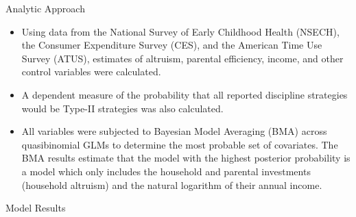 \documentclass[handout]{beamer}
\begin{document}
\begin{frame}{Analytic Approach}

\begin{itemize}[<+->]
\itemsep1pt\parskip0pt
\item
  Using data from the National Survey of Early Childhood Health (NSECH),
  the Consumer Expenditure Survey (CES), and the American Time Use
  Survey (ATUS), estimates of altruism, parental efficiency, income, and
  other control variables were calculated.
\end{itemize}

\begin{itemize}[<+->]
\itemsep1pt\parskip0pt
\item
  A dependent measure of the probability that all reported discipline
  strategies would be Type-II strategies was also calculated.
\end{itemize}

\begin{itemize}[<+->]
\itemsep1pt\parskip0pt
\item
  All variables were subjected to Bayesian Model Averaging (BMA) across
  quasibinomial GLMs to determine the most probable set of covariates.
  The BMA results estimate that the model with the highest posterior
  probability is a model which only includes the household and parental
  investments (household altruism) and the natural logarithm of their
  annual income.
\end{itemize}

\end{frame}

\begin{frame}{Model Results}


\end{frame}
\end{document}
